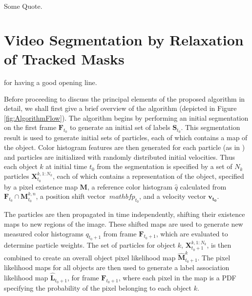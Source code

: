 \begin{savequote}[75mm]
Some Quote.
\end{savequote}


\chapter{Video Segmentation by Relaxation of Tracked Masks}
 for having a good opening line. 

Before proceeding to discuss the principal elements of the proposed algorithm in detail, we shall first give a brief overview of the algorithm (depicted in Figure \ref{fig:AlgorithmFlow}). The algorithm begins by performing an initial segmentation on the first frame $\mathbf{F}_{t_0}$ to generate an initial set of labels $\mathbf{S}_{t_0}$. This segmentation result is used to generate initial sets of particles, each of which contains a map of the object. Color histogram features are then generated for each particle (as in \cite{ColorBasedProbabilisticTracking}) and particles are initialized with randomly distributed initial velocities. Thus each object $k$ at initial time $t_0$ from the segmentation is specified by a set of $N_k$ particles $\mathbf{X}^{k,1:N_k}_{t_0}$, each of which contains a representation of the object, specified by a pixel existence map $\mathbf{M}$, a reference color histogram $\mathit{\hat{q}}$ calculated from $\mathbf{F}_{t_0} \cap \mathbf{M}^{k,n}_{t_0}$, a position shift vector $\
mathbf{p_{t_0}}$, and a velocity vector $\mathbf{v_{t_0}}$.

The particles are then propagated in time independently, shifting their existence maps to new regions of the image. These shifted maps are used to generate new measured color histograms $q_{t_0+1}$ from frame $\mathbf{F}_{t_0+1}$, which are evaluated to determine particle weights. The set of particles for object $k$, $\mathbf{X}^{k,1:N_k}_{t_0+1}$, is then combined to create an overall object pixel likelihood map $\mathbf{\hat{M}}^k_{t_0+1}$. The pixel likelihood maps for all objects are then used to generate a label association likelihood map $\mathbf{\hat{L}}_{t_0+1}$, for frame $\mathbf{F}_{t_0+1}$, where each pixel in the map is a PDF specifying the probability of the pixel belonging to each object $k$.

